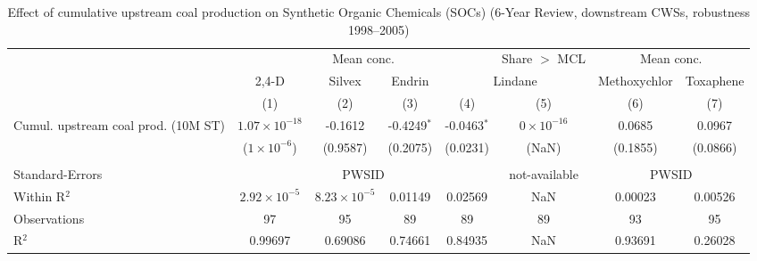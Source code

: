 
\begin{table}[htbp]
   
   \caption{\label{tab:6yr_huc02fe_soc_2005} Effect of cumulative upstream coal production on Synthetic Organic Chemicals (SOCs) (6-Year Review, downstream CWSs, robustness 1998--2005)}
   \bigskip
   
   \centering
   
   \begin{adjustbox}{width = \textwidth, center}
      
      
      \begin{tabular}{lccccccc}
         \toprule
         
          & \multicolumn{4}{c}{Mean conc.} & Share $>$ MCL & \multicolumn{2}{c}{Mean conc.}\\
         
          & 2,4-D & Silvex & Endrin & \multicolumn{2}{c}{Lindane} & Methoxychlor & Toxaphene \\ 
         
                                             & (1)                    & (2)                   & (3)           & (4)           & (5)                 & (6)           & (7)\\  
         
         \midrule 
         Cumul. upstream coal prod. (10M ST) & $1.07\times 10^{-18}$  & -0.1612               & -0.4249$^{*}$ & -0.0463$^{*}$ & $0\times 10^{-16}$  & 0.0685        & 0.0967\\   
                                             & ($1\times 10^{-6}$)    & (0.9587)              & (0.2075)      & (0.0231)      & (NaN)               & (0.1855)      & (0.0866)\\   
         
          \\
         
         Standard-Errors & \multicolumn{4}{c}{PWSID} & not-available & \multicolumn{2}{c}{PWSID} \\ 
         Within R$^2$                        & $2.92\times 10^{-5}$   & $8.23\times 10^{-5}$  & 0.01149       & 0.02569       & NaN                 & 0.00023       & 0.00526\\  
         Observations                        & 97                     & 95                    & 89            & 89            & 89                  & 93            & 95\\  
         R$^2$                               & 0.99697                & 0.69086               & 0.74661       & 0.84935       & NaN                 & 0.93691       & 0.26028\\  
         

\end{tabular}
\end{adjustbox}
\end{table}
